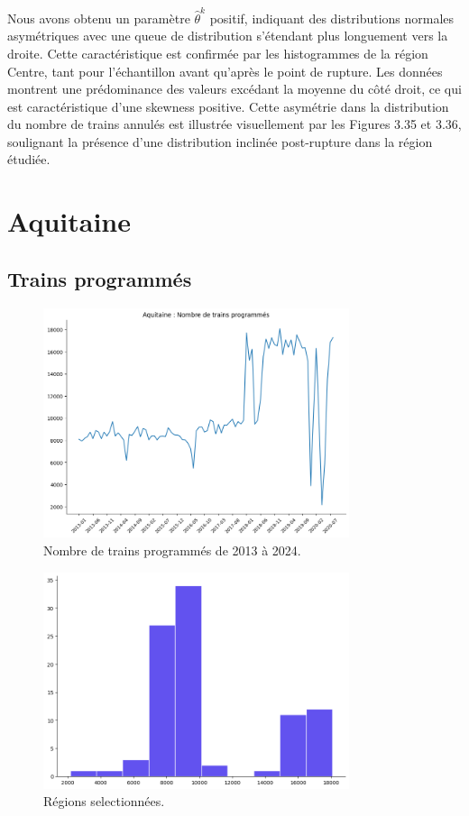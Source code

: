 {Nous avons obtenu un paramètre $\hat{\theta}^k$ positif, indiquant des distributions normales asymétriques avec une queue de distribution s’étendant plus longuement vers la droite. Cette caractéristique est confirmée par les histogrammes de la région Centre, tant pour l'échantillon avant qu'après le point de rupture. Les données montrent une prédominance des valeurs excédant la moyenne du côté droit, ce qui est caractéristique d'une skewness positive. Cette asymétrie dans la distribution du nombre de trains annulés est illustrée visuellement par les Figures 3.35 et 3.36, soulignant la présence d'une distribution inclinée post-rupture dans la région étudiée.


\section{Aquitaine}

\subsection{Trains programmés}

\begin{figure}[H]
\centering
\includegraphics[width=0.8\textwidth]{image/AQ-FIG1.png} 
\caption{Nombre de trains programmés de 2013 à 2024.}
\label{fig:trains_programmes}
\end{figure}

\begin{figure}[H]
\centering
\includegraphics[width=0.8\textwidth]{image/AQ-FIG2.png} 
\caption{Régions selectionnées.}
\label{fig:trains_programmes_2}
\end{figure}


}
